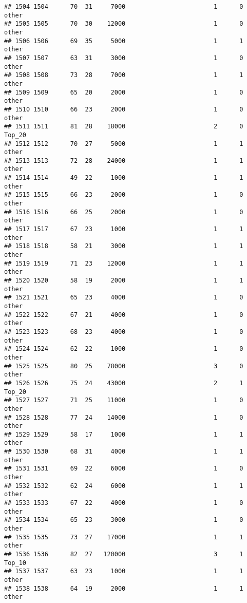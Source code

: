 \documentclass[
]{article}
\begin{document}
\begin{verbatim}
## 1504 1504      70  31     7000                        1      0    other
## 1505 1505      70  30    12000                        1      0    other
## 1506 1506      69  35     5000                        1      1    other
## 1507 1507      63  31     3000                        1      0    other
## 1508 1508      73  28     7000                        1      1    other
## 1509 1509      65  20     2000                        1      0    other
## 1510 1510      66  23     2000                        1      0    other
## 1511 1511      81  28    18000                        2      0   Top_20
## 1512 1512      70  27     5000                        1      1    other
## 1513 1513      72  28    24000                        1      1    other
## 1514 1514      49  22     1000                        1      1    other
## 1515 1515      66  23     2000                        1      0    other
## 1516 1516      66  25     2000                        1      0    other
## 1517 1517      67  23     1000                        1      1    other
## 1518 1518      58  21     3000                        1      1    other
## 1519 1519      71  23    12000                        1      1    other
## 1520 1520      58  19     2000                        1      1    other
## 1521 1521      65  23     4000                        1      0    other
## 1522 1522      67  21     4000                        1      0    other
## 1523 1523      68  23     4000                        1      0    other
## 1524 1524      62  22     1000                        1      0    other
## 1525 1525      80  25    78000                        3      0    other
## 1526 1526      75  24    43000                        2      1   Top_20
## 1527 1527      71  25    11000                        1      0    other
## 1528 1528      77  24    14000                        1      0    other
## 1529 1529      58  17     1000                        1      1    other
## 1530 1530      68  31     4000                        1      1    other
## 1531 1531      69  22     6000                        1      0    other
## 1532 1532      62  24     6000                        1      1    other
## 1533 1533      67  22     4000                        1      0    other
## 1534 1534      65  23     3000                        1      0    other
## 1535 1535      73  27    17000                        1      1    other
## 1536 1536      82  27   120000                        3      1   Top_10
## 1537 1537      63  23     1000                        1      1    other
## 1538 1538      64  19     2000                        1      1    other

\end{verbatim}
\end{document}
